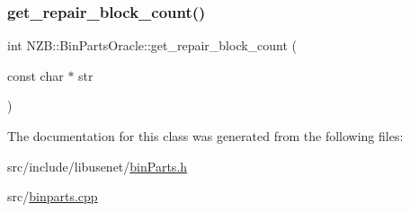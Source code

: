 \subsubsection{\texorpdfstring{get\+\_\+repair\+\_\+block\+\_\+count()}{get\_repair\_block\_count()}}
{\footnotesize\ttfamily int N\+Z\+B\+::\+Bin\+Parts\+Oracle\+::get\+\_\+repair\+\_\+block\+\_\+count (\begin{DoxyParamCaption}\item[{const char $\ast$}]{str }\end{DoxyParamCaption})}



The documentation for this class was generated from the following files\+:\begin{DoxyCompactItemize}
\item 
src/include/libusenet/\hyperlink{bin_parts_8h}{bin\+Parts.\+h}\item 
src/\hyperlink{binparts_8cpp}{binparts.\+cpp}\end{DoxyCompactItemize}
